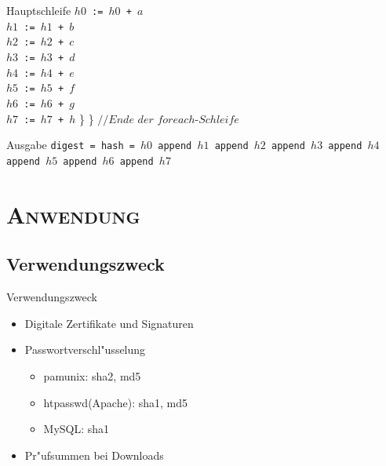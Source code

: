 \documentclass[xcolor=x11names,compress]{beamer}
\renewcommand{\(}{\begin{columns}}
\renewcommand{\)}{\end{columns}}
\newcommand{\<}[1]{\begin{column}{#1}}
\renewcommand{\>}{\end{column}}
\begin{document}
\begin{frame}{Hauptschleife}
\texttt{$h0$ := $h0$ + $a$ \\
    $h1$ := $h1$ + $b$ \\
    $h2$ := $h2$ + $c$ \\
    $h3$ := $h3$ + $d$ \\
    $h4$ := $h4$ + $e$ \\
    $h5$ := $h5$ + $f$ \\
    $h6$ := $h6$ + $g$ \\
    $h7$ := $h7$ + $h$} \newline \} \newline \} $//Ende$ $der$ $foreach$-$Schleife$
\end{frame}

\begin{frame}{Ausgabe}
\texttt{digest = hash = $h0$ append $h1$ append $h2$ append $h3$ append $h4$ append $h5$ append $h6$ append $h7$}
\end{frame}
\section{\scshape Anwendung}
\subsection{Verwendungszweck}
\begin{frame}{Verwendungszweck}

\begin{itemize}
\item Digitale Zertifikate und Signaturen 
	\pause
\item Passwortverschl"usselung
\begin{itemize}
	\item pam\textunderscore unix: sha2, md5
	\item htpasswd(Apache): sha1, md5
	\item MySQL: sha1
\end{itemize}
\pause
\item Pr"ufsummen bei Downloads
\end{itemize}


\end{frame}
\end{document}
